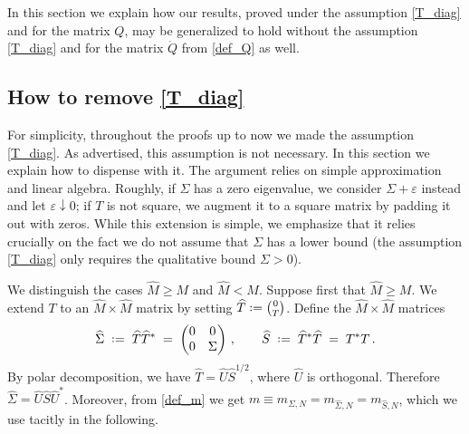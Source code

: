 \documentclass[11pt]{article} %
\numberwithin{equation}{section}
\numberwithin{figure}{section}
\theoremstyle{plain} %
\theoremstyle{definition} %
\newcommand{\wh}{\widehat}
\newcommand*{\deq}{\mathrel{\vcenter{\baselineskip0.65ex \lineskiplimit0pt \hbox{.}\hbox{.}}}=}
\renewcommand{\geq}{\geqslant}
\renewcommand{\epsilon}{\varepsilon}
\begin{document}
In this section we explain how our results, proved under the assumption \eqref{T_diag} and for the matrix $Q$, may be generalized to hold without the assumption \eqref{T_diag} and for the matrix $\dot Q$ from \eqref{def_Q} as well.

\subsection{How to remove \eqref{T_diag}} \label{sec:gen_T}
For simplicity, throughout the proofs up to now we made the assumption \eqref{T_diag}. As advertised, this assumption is not necessary. In this section we explain how to dispense with it. The argument relies on simple approximation and linear algebra. Roughly, if $\Sigma$ has a zero eigenvalue, we consider $\Sigma + \epsilon$ instead and let $\epsilon \downarrow 0$; if $T$ is not square, we augment it to a square matrix by padding it out with zeros. While this extension is simple, we emphasize that it relies crucially on the fact we do not assume that $\Sigma$ has a lower bound (the assumption \eqref{T_diag} only requires the qualitative bound $\Sigma > 0$).

We distinguish the cases $\wh M \geq M$ and $\wh M < M$. Suppose first that $\wh M \geq M$. We extend $T$ to an $\wh M \times \wh M$ matrix by setting
$\wh T \deq \binom{0}{T}
$.
Define the $\wh M \times \wh M$ matrices
\begin{equation*}
\wh \Sigma \;\deq\; \wh T \wh T^* \;=\; \begin{pmatrix}
0 & 0 \\ 0 & \Sigma
\end{pmatrix}\,,
\qquad \wh S \;\deq\; \wh T^* \wh T \;=\; T^* T\,.
\end{equation*}
By polar decomposition, we have
$\wh T = \wh U \wh S^{1/2}$,
where $\wh U$ is orthogonal. Therefore
$\wh \Sigma = \wh U \wh S \wh U^*$.
Moreover, from \eqref{def_m} we get $m \equiv m_{\Sigma, N} = m_{\wh \Sigma, N} = m_{\wh S, N}$, which we use tacitly in the following.
\end{document}
